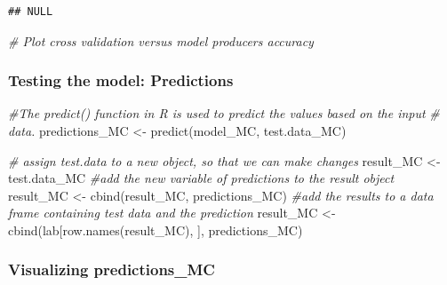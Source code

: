 \documentclass[
]{article}
\newenvironment{Shaded}{\begin{snugshade}}{\end{snugshade}}
\newcommand{\AttributeTok}[1]{\textcolor[rgb]{0.77,0.63,0.00}{#1}}
\newcommand{\CommentTok}[1]{\textcolor[rgb]{0.56,0.35,0.01}{\textit{#1}}}
\newcommand{\FunctionTok}[1]{\textcolor[rgb]{0.00,0.00,0.00}{#1}}
\newcommand{\NormalTok}[1]{#1}
\newcommand{\OtherTok}[1]{\textcolor[rgb]{0.56,0.35,0.01}{#1}}
\newcommand{\SpecialCharTok}[1]{\textcolor[rgb]{0.00,0.00,0.00}{#1}}
\begin{document}
\begin{verbatim}
## NULL
\end{verbatim}

\begin{Shaded}
\begin{Highlighting}[]
\CommentTok{\# Plot cross validation versus model producers accuracy}
\end{Highlighting}
\end{Shaded}

\hypertarget{testing-the-model-predictions-1}{%
\subsubsection{Testing the model:
Predictions}\label{testing-the-model-predictions-1}}

\begin{Shaded}
\begin{Highlighting}[]
\CommentTok{\#The predict() function in R is used to predict the values based on the input }
\CommentTok{\# data.}
\NormalTok{predictions\_MC }\OtherTok{\textless{}{-}} \FunctionTok{predict}\NormalTok{(model\_MC, test.data\_MC)}

\CommentTok{\# assign test.data to a new object, so that we can make changes}
\NormalTok{result\_MC }\OtherTok{\textless{}{-}}\NormalTok{ test.data\_MC}
\CommentTok{\#add the new variable of predictions to the result object}
\NormalTok{result\_MC }\OtherTok{\textless{}{-}} \FunctionTok{cbind}\NormalTok{(result\_MC, predictions\_MC)}
\CommentTok{\#add the results to a data frame containing test data and the prediction}
\NormalTok{result\_MC }\OtherTok{\textless{}{-}} \FunctionTok{cbind}\NormalTok{(lab[}\FunctionTok{row.names}\NormalTok{(result\_MC), ], predictions\_MC)}
\end{Highlighting}
\end{Shaded}

\hypertarget{visualizing-predictions_mc}{%
\subsubsection{Visualizing
predictions\_MC}\label{visualizing-predictions_mc}}

\begin{Shaded}
\end{Shaded}
\end{document}
